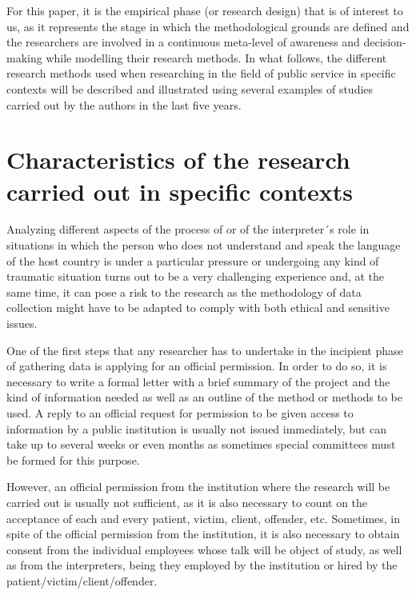 \documentclass[output=paper]{LSP/langsci}
\begin{document}
For this paper, it is the empirical phase (or research design) that is of interest to us, as it represents the stage in which the methodological grounds are defined \citep[62]{Borja2009} and the researchers are involved in a continuous meta-level of awareness and decision-making \citep[80]{Halverson2009} while modelling their research methods. In what follows, the different research methods used when researching in the field of public service  in specific contexts will be described and illustrated using several examples of studies carried out by the authors in the last five years.

\section{Characteristics of the research carried out in specific contexts}

Analyzing different aspects of the process of  or of the interpreter´s role in situations in which the person who does not understand and speak the language of the host country is under a particular pressure or undergoing any kind of traumatic situation turns out to be a very challenging experience and, at the same time, it can pose a risk to the research as the methodology of data collection might have to be adapted to comply with both ethical and sensitive issues. 

One of the first steps that any researcher has to undertake in the incipient phase of gathering data is applying for an official permission. In order to do so, it is necessary to write a formal letter with a brief summary of the project and the kind of information needed as well as an outline of the method or methods to be used. A reply to an official request for permission to be given access to information by a public institution is usually not issued immediately, but can take up to several weeks or even months as sometimes special committees must be formed for this purpose. 

However, an official permission from the institution where the research will be carried out is usually not sufficient, as it is also necessary to count on the acceptance of each and every patient, victim, client, offender, etc. Sometimes, in spite of the official permission from the institution, it is also necessary to obtain consent from the individual employees whose talk will be object of study, as well as from the interpreters, being they employed by the institution or hired by the patient\slash victim\slash client\slash offender.
\end{document}
